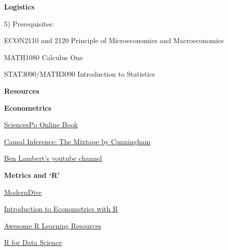 \documentclass[11pt, aspectratio=169]{beamer}
\newenvironment{wideitemize}{\itemize\addtolength{\itemsep}{5pt}}{\enditemize}
\newenvironment{wideenumerate}{\enumerate\addtolength{\itemsep}{5pt}}{\endenumerate}
\begin{document}
\begin{frame}{\bf \large Logistics}
\begin{wideenumerate}
	\item[5)] Prerequisites:
\begin{wideitemize}
	\item ECON2110 and 2120 Principle of Microeconomics and Macroeconomics 
	\item MATH1080 Calculus One
	\item STAT3090/MATH3090 Introduction to Statistics
\end{wideitemize}
\end{wideenumerate}
\end{frame}

\begin{frame}{\bf \large Resources}
\begin{wideitemize}
	\item \textbf{Econometrics}
\begin{wideitemize}
	\item \href{https://scpoecon.github.io/ScPoEconometrics/index.html}{SciencesPo Online Book}
	\item \href{https://mixtape.scunning.com/}{Causal Inference: The Mixtape by Cunningham}
	\item \href{https://www.youtube.com/user/SpartacanUsuals}{Ben Lambert's youtube channel}
\end{wideitemize}
			\item \textbf{Metrics and `R'}
\begin{wideitemize}
	\item \href{https://moderndive.com/}{ModernDive}
	\item \href{https://www.econometrics-with-r.org/}{Introduction to Econometrics with R}
	\item \href{https://github.com/iamericfletcher/awesome-r-learning-resources}{Awesome R Learning Resources}
	\item \href{https://r4ds.hadley.nz/}{R for Data Science}
\end{wideitemize}	
\end{wideitemize}
	
\end{frame}
\end{document}
